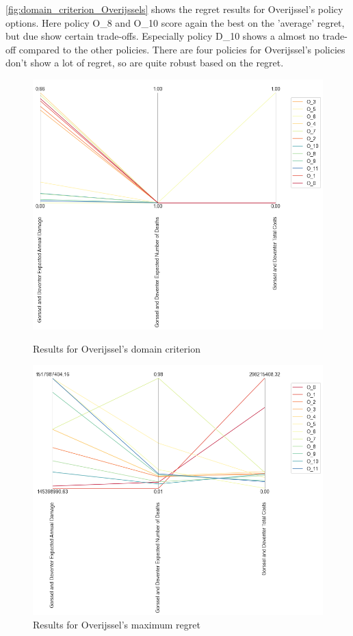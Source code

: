 \noindent \autoref{fig:domain_criterion_Overijssels} shows the regret results for Overijssel's policy options. Here policy O\_8 and O\_10 score again the best on the 'average' regret, but due show certain trade-offs. Especially policy D\_10 shows a almost no trade-off compared to the other policies. There are four policies for Overijssel's policies don't show a lot of regret, so are quite robust based on the regret.

\begin{figure}[H]
  \centering
  \begin{minipage}[b]{0.4\textwidth}
    \includegraphics[width=1.2\textwidth]{report/figures/results/domain_criterion_Overijssel.png}
    \caption{Results for Overijssel's domain criterion}
    \label{fig:domain_criterion_Overijssels}
  \end{minipage}
  \hfill
  \begin{minipage}[b]{0.4\textwidth}
    \includegraphics[width=1.2\textwidth]{report/figures/results/regret_figure_Overijssel.png}
    \caption{Results for Overijssel's maximum regret}
    \label{fig:regret_Overijssels}
  \end{minipage}
\end{figure}

